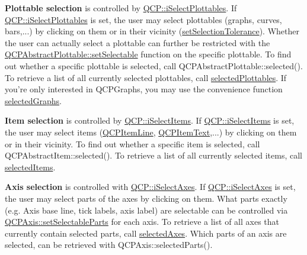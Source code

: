 {\bfseries \-Plottable selection} is controlled by \hyperlink{namespaceQCP_a2ad6bb6281c7c2d593d4277b44c2b037a67148c8227b4155eca49135fc274c7ec}{\-Q\-C\-P\-::i\-Select\-Plottables}. \-If \hyperlink{namespaceQCP_a2ad6bb6281c7c2d593d4277b44c2b037a67148c8227b4155eca49135fc274c7ec}{\-Q\-C\-P\-::i\-Select\-Plottables} is set, the user may select plottables (graphs, curves, bars,...) by clicking on them or in their vicinity (\hyperlink{classQCustomPlot_a4dc31241d7b09680950e19e5f971ed93}{set\-Selection\-Tolerance}). \-Whether the user can actually select a plottable can further be restricted with the \hyperlink{classQCPAbstractPlottable_a22c69299eb5569e0f6bf084877a37dc4}{\-Q\-C\-P\-Abstract\-Plottable\-::set\-Selectable} function on the specific plottable. \-To find out whether a specific plottable is selected, call \-Q\-C\-P\-Abstract\-Plottable\-::selected(). \-To retrieve a list of all currently selected plottables, call \hyperlink{classQCustomPlot_a6721b8c689bb7f2f400987e580508fe8}{selected\-Plottables}. \-If you're only interested in \-Q\-C\-P\-Graphs, you may use the convenience function \hyperlink{classQCustomPlot_ad2a0493bdd01e7aa99a4209ae3a5b67b}{selected\-Graphs}.

{\bfseries \-Item selection} is controlled by \hyperlink{namespaceQCP_a2ad6bb6281c7c2d593d4277b44c2b037aea2f7c105d674e76d9b187b02ef29260}{\-Q\-C\-P\-::i\-Select\-Items}. \-If \hyperlink{namespaceQCP_a2ad6bb6281c7c2d593d4277b44c2b037aea2f7c105d674e76d9b187b02ef29260}{\-Q\-C\-P\-::i\-Select\-Items} is set, the user may select items (\hyperlink{classQCPItemLine}{\-Q\-C\-P\-Item\-Line}, \hyperlink{classQCPItemText}{\-Q\-C\-P\-Item\-Text},...) by clicking on them or in their vicinity. \-To find out whether a specific item is selected, call \-Q\-C\-P\-Abstract\-Item\-::selected(). \-To retrieve a list of all currently selected items, call \hyperlink{classQCustomPlot_a1a48b13547e2d9ac5cd6927516f47a2e}{selected\-Items}.

{\bfseries \-Axis selection} is controlled with \hyperlink{namespaceQCP_a2ad6bb6281c7c2d593d4277b44c2b037ad6644ac55bef621645326e9dd7469caa}{\-Q\-C\-P\-::i\-Select\-Axes}. \-If \hyperlink{namespaceQCP_a2ad6bb6281c7c2d593d4277b44c2b037ad6644ac55bef621645326e9dd7469caa}{\-Q\-C\-P\-::i\-Select\-Axes} is set, the user may select parts of the axes by clicking on them. \-What parts exactly (e.\-g. \-Axis base line, tick labels, axis label) are selectable can be controlled via \hyperlink{classQCPAxis_a513f9b9e326c505d9bec54880031b085}{\-Q\-C\-P\-Axis\-::set\-Selectable\-Parts} for each axis. \-To retrieve a list of all axes that currently contain selected parts, call \hyperlink{classQCustomPlot_aa6baf867e8beb96ed5bd471f83ece903}{selected\-Axes}. \-Which parts of an axis are selected, can be retrieved with \-Q\-C\-P\-Axis\-::selected\-Parts().

